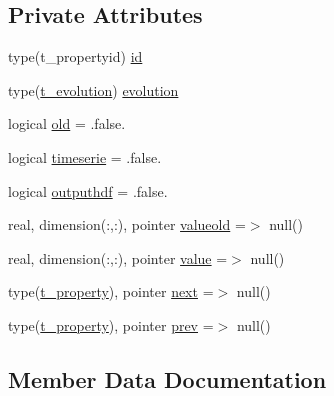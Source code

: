 \subsection*{Private Attributes}
\begin{DoxyCompactItemize}
\item 
type(t\+\_\+propertyid) \mbox{\hyperlink{structmodulesnow_1_1t__property_afdcc3c7af43d26bfdb51bb25e82ef6a9}{id}}
\item 
type(\mbox{\hyperlink{structmodulesnow_1_1t__evolution}{t\+\_\+evolution}}) \mbox{\hyperlink{structmodulesnow_1_1t__property_ad9433c9af28a2865faf4b59f26962442}{evolution}}
\item 
logical \mbox{\hyperlink{structmodulesnow_1_1t__property_a92c24b2fe09e9e812f435d6e48db4843}{old}} = .false.
\item 
logical \mbox{\hyperlink{structmodulesnow_1_1t__property_aad061443ecba50d1ae71c962df75d1a1}{timeserie}} = .false.
\item 
logical \mbox{\hyperlink{structmodulesnow_1_1t__property_a97b2e5f97f9d191a69e19197d7164422}{outputhdf}} = .false.
\item 
real, dimension(\+:,\+:), pointer \mbox{\hyperlink{structmodulesnow_1_1t__property_a9dca2a599f0f5d2639429950e9d857cc}{valueold}} =$>$ null()
\item 
real, dimension(\+:,\+:), pointer \mbox{\hyperlink{structmodulesnow_1_1t__property_ab85e91ab340a64167733fb9a5f405efc}{value}} =$>$ null()
\item 
type(\mbox{\hyperlink{structmodulesnow_1_1t__property}{t\+\_\+property}}), pointer \mbox{\hyperlink{structmodulesnow_1_1t__property_a0a60dd6108135efa890b9e341cc107f5}{next}} =$>$ null()
\item 
type(\mbox{\hyperlink{structmodulesnow_1_1t__property}{t\+\_\+property}}), pointer \mbox{\hyperlink{structmodulesnow_1_1t__property_a9d6fc0e8cd81879fbfae48b58397d186}{prev}} =$>$ null()
\end{DoxyCompactItemize}


\subsection{Member Data Documentation}
\mbox{\label{structmodulesnow_1_1t__property_ad9433c9af28a2865faf4b59f26962442}} 
